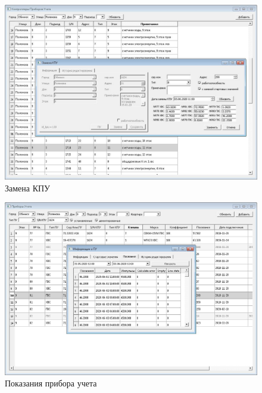 \documentclass[a4paper,12pt]{article}
\begin{document}
\begin{figure}[H]
	\centering
	\includegraphics[width=0.9\linewidth]{pics/6}
	\caption{Замена КПУ}
	\label{fig:6}
\end{figure}
\begin{figure}[H]
	\centering
	\includegraphics[width=0.9\linewidth]{pics/9}
	\caption{Показания прибора учета}
	\label{fig:9}
\end{figure}

\pagebreak
\end{document}
